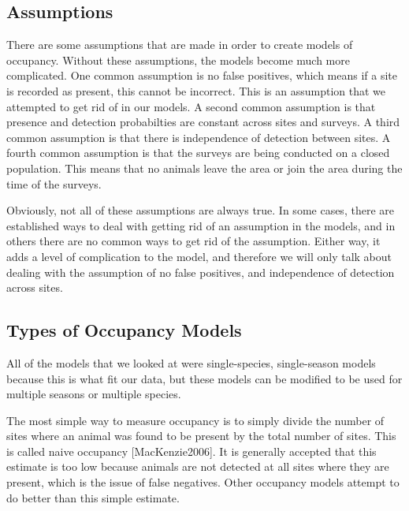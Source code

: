 \documentclass{article}
\begin{document}
	\subsection{Assumptions}

	There are some assumptions that are made in order to create models of 
occupancy.  Without these assumptions, the models become much more complicated.
One common assumption is no false positives, which means if a site is recorded as
present, this cannot be incorrect.  This is an assumption that we attempted to 
get rid of in our models.  A second common assumption is that presence and 
detection probabilties are constant across sites and surveys.  A third common 
assumption is that there is independence of detection between sites.  A fourth
common assumption is that the surveys are being conducted on a closed population.
This means that no animals leave the area or join the area during the time of the
surveys.  

	Obviously, not all of these assumptions are always true.  In some cases, there
are established ways to deal with getting rid of an assumption in the models, 
and in others there are no common ways to get rid of the assumption.  Either way, 
it adds a level of complication to the model, and therefore we will only talk 
about dealing with the assumption of no false positives, and independence of 
detection across sites.

	\subsection{Types of Occupancy Models}

		All of the models that we looked at were single-species, single-season
models because this is what fit our data, but these models can be modified to
be used for multiple seasons or multiple species.  

	The most simple way to measure occupancy is to simply divide the number 
of sites where an animal was found to be present by the total number of sites.  
This is called naive occupancy [MacKenzie2006].  It is generally accepted that 
this estimate is too low because animals are not detected at all sites where they
are present, which is the issue of false negatives.  Other occupancy models
attempt to do better than this simple estimate.
\end{document}
